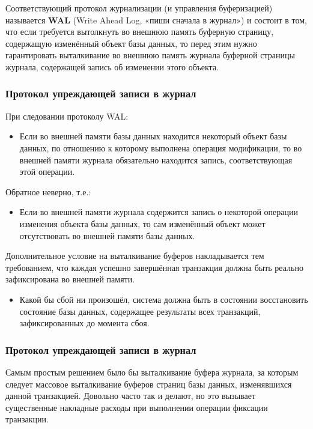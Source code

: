 \documentclass[a4paper,12pt]{article}
\begin{document}
Соответствующий протокол журнализации (и управления буферизацией) называется \textbf{WAL} (Write Ahead Log, «пиши сначала в журнал») и состоит в том, что если требуется вытолкнуть во внешнюю память буферную страницу, содержащую изменённый объект базы данных, то перед этим нужно гарантировать выталкивание во внешнюю память журнала буферной страницы журнала, содержащей запись об изменении этого объекта.

\subsubsection{Протокол упреждающей записи в журнал}

При следовании протоколу WAL:
\begin{itemize}
    \item Если во внешней памяти базы данных находится некоторый объект базы данных, по отношению к которому выполнена операция модификации, то во внешней памяти журнала обязательно находится запись, соответствующая этой операции.
\end{itemize}

Обратное неверно, т.е.:
\begin{itemize}
    \item Если во внешней памяти журнала содержится запись о некоторой операции изменения объекта базы данных, то сам изменённый объект может отсутствовать во внешней памяти базы данных.
\end{itemize}

Дополнительное условие на выталкивание буферов накладывается тем требованием, что каждая успешно завершённая транзакция должна быть реально зафиксирована во внешней памяти.

\begin{itemize}
    \item Какой бы сбой ни произошёл, система должна быть в состоянии восстановить состояние базы данных, содержащее результаты всех транзакций, зафиксированных до момента сбоя.
\end{itemize}

\subsubsection{Протокол упреждающей записи в журнал}

Самым простым решением было бы выталкивание буфера журнала, за которым следует массовое выталкивание буферов страниц базы данных, изменявшихся данной транзакцией. Довольно часто так и делают, но это вызывает существенные накладные расходы при выполнении операции фиксации транзакции.
\end{document}
